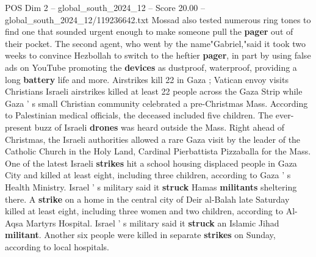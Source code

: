 \begin{textsample}{POS Dim 2 – global\_south\_2024\_12 – Score 20.00 – global\_south\_2024\_12/119236642.txt}
Mossad also tested numerous ring tones to find one that sounded urgent enough to make someone pull the \textbf{pager} out of their pocket.
The second agent, who went by the name"Gabriel,"said it took two weeks to convince Hezbollah to switch to the heftier \textbf{pager}, in part by using false ads on YouTube promoting the \textbf{devices} as dustproof, waterproof, providing a long \textbf{battery} life and more.
Airstrikes kill 22 in Gaza ; Vatican envoy visits Christians Israeli airstrikes killed at least 22 people across the Gaza Strip while Gaza ' s small Christian community celebrated a pre-Christmas Mass.
According to Palestinian medical officials, the deceased included five children.
The ever-present buzz of Israeli \textbf{drones} was heard outside the Mass.
Right ahead of Christmas, the Israeli authorities allowed a rare Gaza visit by the leader of the Catholic Church in the Holy Land, Cardinal Pierbattista Pizzaballa for the Mass.
One of the latest Israeli \textbf{strikes} hit a school housing displaced people in Gaza City and killed at least eight, including three children, according to Gaza ' s Health Ministry.
Israel ' s military said it \textbf{struck} Hamas \textbf{militants} sheltering there.
A \textbf{strike} on a home in the central city of Deir al-Balah late Saturday killed at least eight, including three women and two children, according to Al-Aqsa Martyrs Hospital.
Israel ' s military said it \textbf{struck} an Islamic Jihad \textbf{militant}.
Another six people were killed in separate \textbf{strikes} on Sunday, according to local hospitals.

\end{textsample}
